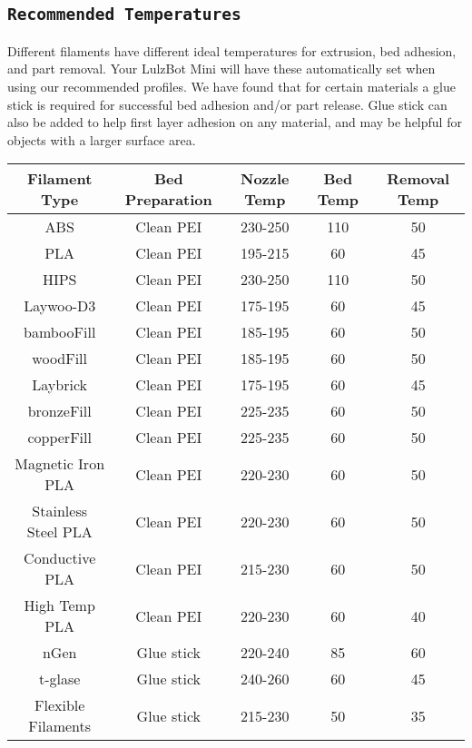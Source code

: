 \subsection{\texttt{Recommended Temperatures}}
Different filaments have different ideal temperatures for extrusion, bed adhesion, and part removal. Your LulzBot Mini will have these automatically set when using our recommended profiles. We have found that for certain materials a glue stick is required for successful bed adhesion and/or part release. Glue stick can also be added to help first layer adhesion on any material, and may be helpful for objects with a larger surface area. 
\begin{table}[H]
	\begin{center}
 		\hspace*{-1.5cm}\begin{tabular}{||c c c c c||} 
 		\hline
 		Filament Type & Bed Preparation & Nozzle Temp & Bed Temp & Removal Temp \\ [0.5ex] 
 		\hline\hline
 		ABS & Clean PEI & 230-250 & 110 & 50 \\ 
 		\hline
 		PLA & Clean PEI & 195-215 & 60 & 45\\
 		\hline
 		HIPS & Clean PEI & 230-250 & 110 & 50 \\
 		\hline
 		Laywoo-D3 & Clean PEI & 175-195 & 60 & 45 \\
 		\hline
		bambooFill & Clean PEI & 185-195 & 60 & 50 \\ 
 		\hline
		woodFill & Clean PEI & 185-195 & 60 & 50 \\
 		\hline
 		Laybrick & Clean PEI & 175-195 & 60 & 45 \\
		\hline
		bronzeFill & Clean PEI & 225-235 & 60 & 50 \\
		\hline
		copperFill & Clean PEI & 225-235 & 60 & 50 \\
 		\hline 
 		Magnetic Iron PLA & Clean PEI & 220-230 & 60 & 50 \\
 		\hline
 		Stainless Steel PLA & Clean PEI & 220-230 & 60 & 50 \\
 		\hline
 		Conductive PLA & Clean PEI & 215-230 & 60 & 50 \\
		\hline
		High Temp PLA & Clean PEI & 220-230 & 60 & 40 \\
 		\hline
 		nGen & Glue stick & 220-240 & 85 & 60 \\
 		\hline
 		t-glase & Glue stick & 240-260 & 60 & 45 \\
 		\hline
 		Flexible Filaments & Glue stick & 215-230 & 50 & 35 \\  

\end{tabular}
\end{center}
\end{table}
